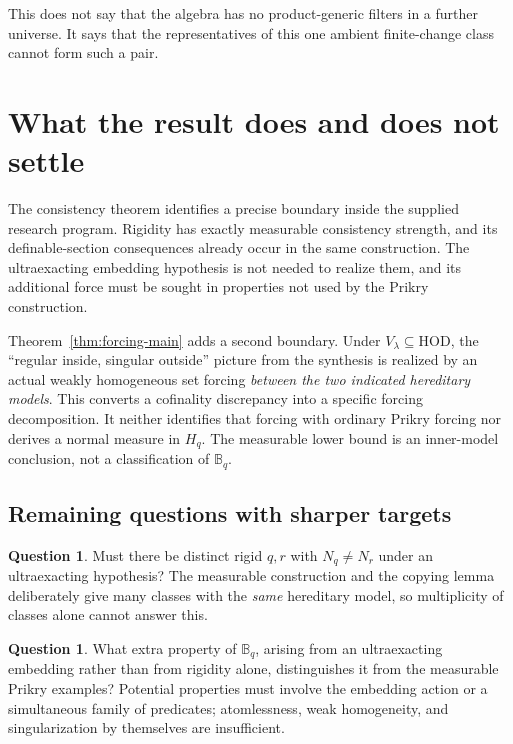 \documentclass[11pt,letterpaper]{article}
\theoremstyle{definition}
\newtheorem{question}[definition]{Question}
\numberwithin{equation}{section}
\newcommand{\HOD}{\mathrm{HOD}}
\newcommand{\BB}{\mathbb B}
\begin{document}
This does not say that the algebra has no product-generic filters in a
further universe. It says that the representatives of this one ambient
finite-change class cannot form such a pair.

\section{What the result does and does not settle}\label{sec:scope}

The consistency theorem identifies a precise boundary inside the supplied
research program. Rigidity has exactly measurable consistency strength,
and its definable-section consequences already occur in the same construction. The ultraexacting embedding hypothesis is not
needed to realize them, and its additional force must be sought in
properties not used by the Prikry construction.

Theorem~\ref{thm:forcing-main} adds a second boundary. Under
$V_\lambda\subseteq\HOD$, the ``regular inside, singular outside'' picture
from the synthesis is realized by an actual weakly homogeneous set forcing
\emph{between the two indicated hereditary models}. This converts a
cofinality discrepancy into a specific forcing decomposition. It neither
identifies that forcing with ordinary Prikry forcing nor derives a normal
measure in $H_q$. The measurable lower bound is an inner-model conclusion,
not a classification of $\BB_q$.

\subsection{Remaining questions with sharper targets}

\begin{question}
Must there be distinct rigid $q,r$ with $N_q\ne N_r$ under an
ultraexacting hypothesis? The measurable construction and the copying
lemma deliberately give many classes with the \emph{same} hereditary
model, so multiplicity of classes alone cannot answer this.
\end{question}

\begin{question}
What extra property of $\BB_q$, arising from an ultraexacting embedding
rather than from rigidity alone, distinguishes it from the measurable
Prikry examples? Potential properties must involve the embedding action
or a simultaneous family of predicates; atomlessness, weak homogeneity,
and singularization by themselves are insufficient.
\end{question}
\end{document}
